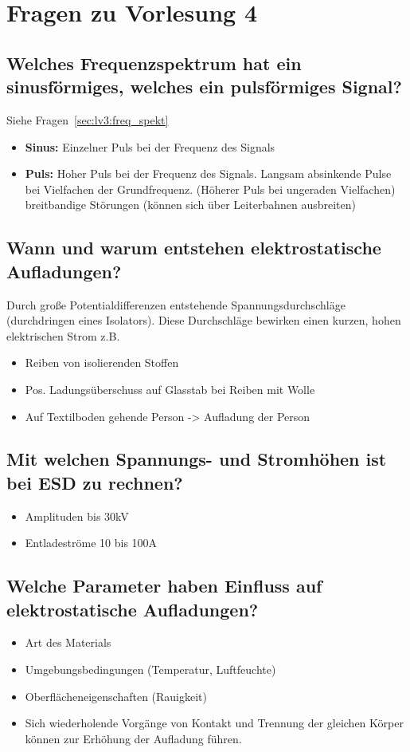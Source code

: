 \section{Fragen zu Vorlesung 4}

\subsection{Welches Frequenzspektrum hat ein sinusförmiges, welches ein pulsförmiges Signal?}
Siehe Fragen~\ref{sec:lv3:freq_spekt}
\begin{itemize}
  \item \textbf{Sinus:} Einzelner Puls bei der Frequenz des Signals
  \item \textbf{Puls:} Hoher Puls bei der Frequenz des Signals. Langsam absinkende Pulse bei Vielfachen der Grundfrequenz. (Höherer Puls bei ungeraden Vielfachen)
  breitbandige Störungen (können sich über Leiterbahnen ausbreiten)
\end{itemize}

\subsection{Wann und warum entstehen elektrostatische Aufladungen?}\label{sec:lv4:electrostatic}
Durch große Potentialdifferenzen entstehende Spannungsdurchschläge (durchdringen eines Isolators). Diese Durchschläge bewirken einen kurzen, hohen elektrischen Strom\p
z.B.
\begin{itemize}
  \item Reiben von isolierenden Stoffen
  \item Pos. Ladungsüberschuss auf Glasstab bei Reiben mit Wolle
  \item Auf Textilboden gehende Person -> Aufladung der Person
\end{itemize}

\subsection{Mit welchen Spannungs- und Stromhöhen ist bei ESD zu rechnen?}
\begin{itemize}
  \item Amplituden bis 30kV
  \item Entladeströme 10 bis 100A
\end{itemize}

\subsection{Welche Parameter haben Einfluss auf elektrostatische Aufladungen?}
\begin{itemize}
  \item Art des Materials
  \item Umgebungsbedingungen (Temperatur, Luftfeuchte)
  \item Oberflächeneigenschaften (Rauigkeit)
  \item Sich wiederholende Vorgänge von Kontakt und Trennung der gleichen Körper können zur Erhöhung der Aufladung führen.
\end {itemize}


